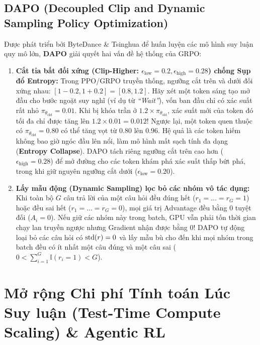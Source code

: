 \subsection{DAPO (Decoupled Clip and Dynamic Sampling Policy Optimization)}

Được phát triển bởi ByteDance \& Tsinghua \citep{yu2025dapo} để huấn luyện các mô hình suy luận quy mô lớn, \textbf{DAPO} giải quyết hai vấn đề hệ thống của GRPO:

\begin{enumerate}
  \item \textbf{Cắt tỉa bất đối xứng (Clip-Higher: $\epsilon_{\text{low}} = 0.2, \epsilon_{\text{high}} = 0.28$) chống Sụp đổ Entropy:}
  Trong PPO/GRPO truyền thống, ngưỡng cắt trên và dưới đối xứng nhau: $[1 - 0.2, 1 + 0.2] = [0.8, 1.2]$.
  Hãy xét một token sáng tạo mở đầu cho bước ngoặt suy nghĩ (ví dụ từ \textit{``Wait''}), vốn ban đầu chỉ có xác suất rất nhỏ $\pi_{\theta_{\text{old}}} = 0.01$. Khi bị khóa trần ở $1.2 \times \pi_{\theta_{\text{old}}}$, xác suất mới của token đó tối đa chỉ được tăng lên $1.2 \times 0.01 = 0.012$! Ngược lại, một token quen thuộc có $\pi_{\theta_{\text{old}}} = 0.80$ có thể tăng vọt từ $0.80$ lên $0.96$. Hệ quả là các token hiếm không bao giờ ngóc đầu lên nổi, làm mô hình mất sạch tính đa dạng (\textbf{Entropy Collapse}).
  DAPO tách riêng ngưỡng cắt trên cao hơn ($\epsilon_{\text{high}} = 0.28$) để mở đường cho các token khám phá xác suất thấp bứt phá, trong khi giữ nguyên ngưỡng cắt dưới ($\epsilon_{\text{low}} = 0.20$).
  \item \textbf{Lấy mẫu động (Dynamic Sampling) lọc bỏ các nhóm vô tác dụng:}
  Khi toàn bộ $G$ câu trả lời của một câu hỏi đều đúng hết ($r_1 = \dots = r_G = 1$) hoặc đều sai hết ($r_1 = \dots = r_G = 0$), mọi giá trị Advantage đều bằng $0$ tuyệt đối ($A_i = 0$). Nếu giữ các nhóm này trong batch, GPU vẫn phải tốn thời gian chạy lan truyền ngược nhưng Gradient nhận được bằng $0$! DAPO tự động loại bỏ các câu hỏi có $\operatorname{\mathrm{std}}(r) = 0$ và lấy mẫu bù cho đến khi mọi nhóm trong batch đều có ít nhất một câu đúng và một câu sai ($0 < \sum_{i=1}^G \mathbb{I}(r_i = 1) < G$).
\end{enumerate}

\section{Mở rộng Chi phí Tính toán Lúc Suy luận (Test-Time Compute Scaling) \& Agentic RL}
\label{sec:ttc_agentic}

